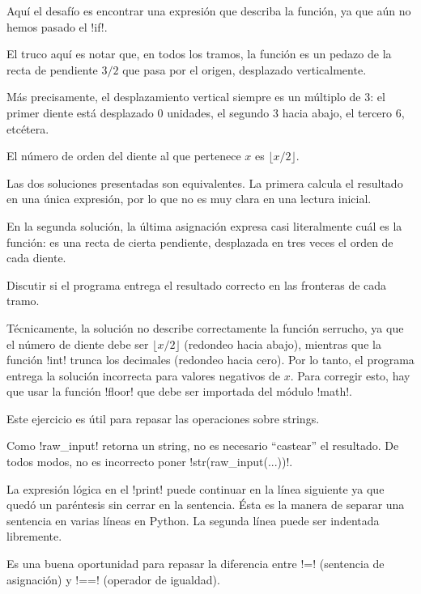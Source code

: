 \documentclass[10pt]{article}
\begin{document}
  Aquí el desafío es encontrar una expresión que describa la función,
  ya que aún no hemos pasado el \li!if!.

  El truco aquí es notar que, en todos los tramos,
  la función es un pedazo de la recta de pendiente \(3/2\)
  que pasa por el origen, desplazado verticalmente.

  Más precisamente,
  el desplazamiento vertical siempre es un múltiplo de 3:
  el primer diente está desplazado 0 unidades,
  el segundo 3 hacia abajo, el tercero 6, etcétera.

  El número de orden del diente al que pertenece \(x\) es \(\lfloor x/2\rfloor\).

  
  Las dos soluciones presentadas son equivalentes.
  La primera calcula el resultado en una única expresión,
  por lo que no es muy clara en una lectura inicial.

  En la segunda solución,
  la última asignación expresa casi literalmente
  cuál es la función:
  es una recta de cierta pendiente,
  desplazada en tres veces el orden de cada diente.

  Discutir si el programa entrega el resultado correcto
  en las fronteras de cada tramo.

  Técnicamente,
  la solución no describe correctamente la función serrucho,
  ya que el número de diente debe ser \(\lfloor x/2\rfloor\)
  (redondeo hacia abajo),
  mientras que la función \li!int! trunca los decimales
  (redondeo hacia cero).
  Por lo tanto,
  el programa entrega la solución incorrecta
  para valores negativos de \(x\).
  Para corregir esto,
  hay que usar la función \li!floor! que debe ser importada
  del módulo \li!math!.


  Este ejercicio es útil para repasar las operaciones sobre strings.


  Como \li!raw_input! retorna un string,
  no es necesario ``castear'' el resultado.
  De todos modos, no es incorrecto poner \li!str(raw_input(...))!.

  La expresión lógica en el \li!print!
  puede continuar en la línea siguiente
  ya que quedó un paréntesis sin cerrar en la sentencia.
  Ésta es la manera de separar una sentencia
  en varias líneas en Python.
  La segunda línea puede ser indentada libremente.

  Es una buena oportunidad para repasar la diferencia
  entre \li!=! (sentencia de asignación)
  y \li!==! (operador de igualdad).
\end{document}
